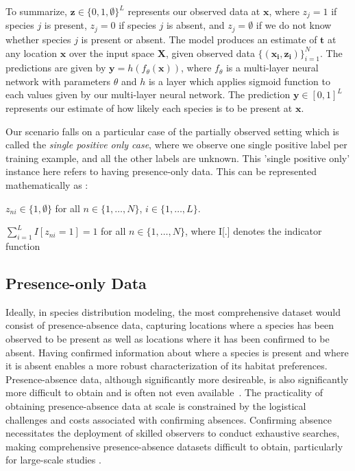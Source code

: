 \documentclass{article}
\begin{document}
To summarize, $\mathbf{z} \in \{0, 1, \emptyset\}^L$ represents our observed data at $\mathbf{x}$, where $z_j = 1$ if species $j$ is present, $z_j = 0$ if species $j$ is absent, and $z_j = \emptyset$ if we do not know whether species $j$ is present or absent. The model produces an estimate of $\mathbf{t}$ at any location $\mathbf{x}$ over the input space $\mathbf{X}$, given observed data $\{(\mathbf{x_i},\mathbf{z_i})\}_{i=1}^N$. The predictions are given by $\mathbf{{y}} = h(f_\theta(\mathbf{x}))$, where $f_\theta$ is a multi-layer neural network with parameters $\theta$ and $h$ is a layer which applies sigmoid function to each values given by our multi-layer neural network. The prediction $\mathbf{{y}} \in [0, 1]^L$ represents our estimate of how likely each species is to be present at $\mathbf{x}$.


Our scenario falls on a particular case of the partially observed setting which is called the \emph{single positive only case}, where we observe one single positive label per training example, and all the other labels are unknown. This 'single positive only' instance here refers to having presence-only data. This can be represented mathematically as :

$z_{ni} \in \{1, \emptyset\}$ for all $n \in \{1, \ldots, N\}$, $i \in \{1, \ldots, L\}$.

$\sum_{i=1}^L I[z_{ni}=1] = 1$ for all $n \in \{1, \ldots, N\}$, where  I[.] denotes the indicator function \cite{cole2021multilabel}

\subsection{Presence-only Data}

Ideally, in species distribution modeling, the most comprehensive dataset would consist of presence-absence data, capturing locations where a species has been observed to be present as well as locations where it has been confirmed to be absent. Having confirmed information about where a species is present and where it is absent enables a more robust characterization of its habitat preferences. Presence-absence data, although significantly more desireable, is also significantly more difficult to obtain and is often not even available~\cite{review,AcknowledgingMultilabelSPLZhou}. The practicality of obtaining presence-absence data at scale is constrained by the logistical challenges and costs associated with confirming absences. Confirming absence necessitates the deployment of skilled observers to conduct exhaustive searches, making comprehensive presence-absence datasets difficult to obtain, particularly for large-scale studies \cite{spatial}.
\end{document}

